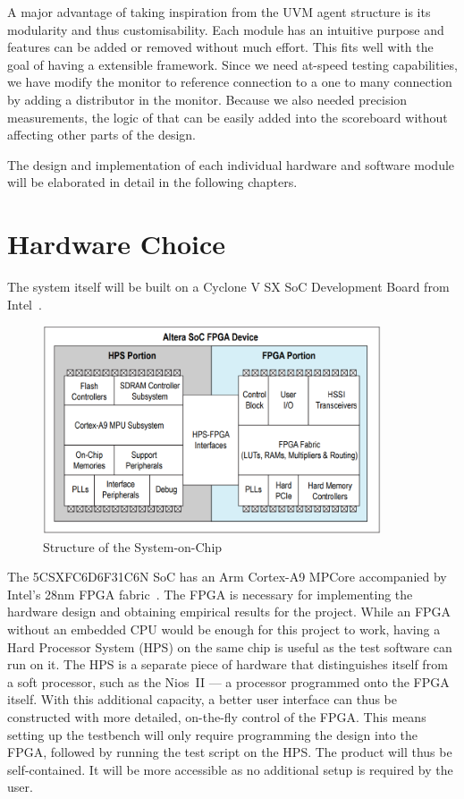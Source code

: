 A major advantage of taking inspiration from the UVM agent structure is its modularity and thus customisability.
Each module has an intuitive purpose and features can be added or removed without much effort.
This fits well with the goal of having a extensible framework.
Since we need at-speed testing capabilities, we have modify the monitor to reference connection to a one to many connection by adding a distributor in the monitor.
Because we also needed precision measurements, the logic of that can be easily added into the scoreboard without affecting other parts of the design.

The design and implementation of each individual hardware and software module will be elaborated in detail in the following chapters.

\section{Hardware Choice}
The system itself will be built on a Cyclone V SX SoC Development Board from Intel~\cite{Intel1}.

\begin{figure}[H]
  \centering
  \includegraphics[width=10cm]{img/SoCStructure}
  \caption{Structure of the System-on-Chip}
  \label{SoCStructure}
\end{figure}

The 5CSXFC6D6F31C6N SoC has an Arm Cortex-A9 MPCore accompanied by Intel's 28nm FPGA fabric~\cite{Altera1}.
The FPGA is necessary for implementing the hardware design and obtaining empirical results for the project.
While an FPGA without an embedded CPU would be enough for this project to work, having a Hard Processor System (HPS) on the same chip is useful as the test software can run on it.
The HPS is a separate piece of hardware that distinguishes itself from a soft processor, such as the Nios~II --- a processor programmed onto the FPGA itself.
With this additional capacity, a better user interface can thus be constructed with more detailed, on-the-fly control of the FPGA.
This means setting up the testbench will only require programming the design into the FPGA, followed by running the test script on the HPS.
The product will thus be self-contained.
It will be more accessible as no additional setup is required by the user.

